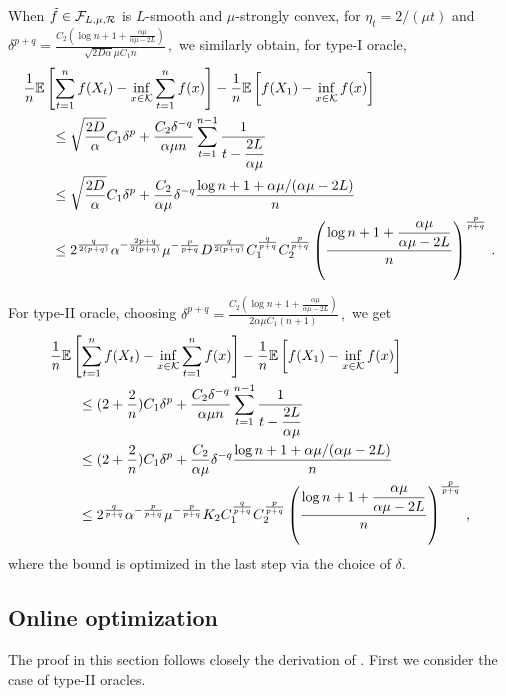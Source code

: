 When $\tilde{f} \in \mathcal{F}_{L,\mu, \mathcal{R}}$ is $L$-smooth and $\mu$-strongly convex, for
$\eta_t = 2/(\mu t)$ and \\
$
\delta^{p+q} =  \tfrac{C_2\left( \log n+1+\tfrac{\alpha \mu}{\alpha \mu -2L}\right)}{\sqrt{2D\alpha} \mu C_1 n} \,,
$
we similarly obtain, for type-I oracle, 
 \begin{align*}
 \MoveEqLeft
\frac{1}{n} \EE{ \sum_{t=1}^n f( X_t) - \inf_{x \in \cK} \sum_{t=1}^n f(x)} -\frac{1}{n}\EE{f(X_1)-\inf_{x \in \cK}f(x)}\\
&\le \sqrt{\dfrac{2D}{\alpha}} C_1\delta^p+\dfrac{C_2 \delta^{-q}}{\alpha \mu n} \sum_{t=1}^{n-1}\dfrac{1}{t-\dfrac{2L}{\alpha \mu}}\\
&\le \sqrt{\dfrac{2D}{\alpha}}C_1\delta^p+\dfrac{C_2 }{\alpha \mu}\delta^{-q} \dfrac{\log n+1+\alpha \mu/(\alpha \mu-2L)}{n}\\
&\le 2^{\frac{q}{2(p+q)}}\alpha^{-\frac{2p+q}{2(p+q)}}\mu^{-\frac{p}{p+q}} D^{\frac{q}{2(p+q)}}C_1^{\frac{q}{p+q}}C_2^{\frac{p}{p+q}} \left( \frac{\log n+1+\dfrac{\alpha \mu}{\alpha \mu -2L}}{n} \right)^{\frac{p}{p+q}}\,.
 \end{align*}

For type-II oracle, choosing
$
\delta^{p+q} =  \tfrac{C_2\left( \log n+1+\tfrac{\alpha \mu}{\alpha \mu -2L}\right)}{2\alpha \mu C_1 (n+1)} \,,
$
we get
 \begin{align*}
 \MoveEqLeft
\frac{1}{n} \EE{ \sum_{t=1}^n f( X_t) - \inf_{x \in \cK} \sum_{t=1}^n f(x)} -\frac{1}{n}\EE{f(X_1)-\inf_{x \in \cK}f(x)}\\
&\le (2+\dfrac{2}{n})C_1\delta^p+\dfrac{C_2 \delta^{-q}}{\alpha \mu n} \sum_{t=1}^{n-1}\dfrac{1}{t-\dfrac{2L}{\alpha \mu}}\\
&\le (2+\dfrac{2}{n})C_1\delta^p+\dfrac{C_2 }{\alpha \mu}\delta^{-q} \dfrac{\log n+1+\alpha \mu/(\alpha \mu-2L)}{n}\\
&\le 2^{\frac{q}{p+q}}\alpha^{-\frac{p}{p+q}}\mu^{-\frac{p}{p+q}} K_2C_1^{\frac{q}{p+q}}C_2^{\frac{p}{p+q}} \left( \frac{\log n+1+\dfrac{\alpha \mu}{\alpha \mu -2L}}{n} \right)^{\frac{p}{p+q}}\,,
 \end{align*}
where the bound is optimized in the last step via the choice of $\delta$.



\subsection{Online optimization}
The proof in this section follows closely the derivation of \citet{saha2011improved}. First we consider the case of type-II oracles.

